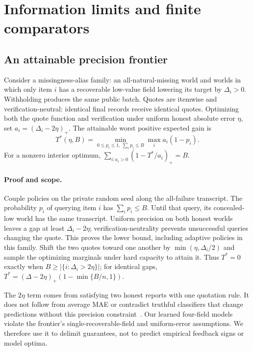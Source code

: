 \documentclass[11pt]{article}
\begin{document}
\section{Information limits and finite comparators}\label{sec:information}
\subsection{An attainable precision frontier}
Consider a missingness-alias family: an all-natural-missing world and worlds
in which only item $i$ has a recoverable low-value field lowering its target
by $\Delta_i>0$. Withholding produces the same public batch. Quotes are
itemwise and verification-neutral: identical final records receive identical
quotes. Optimizing both the quote function and verification under uniform
honest absolute error $\eta$, set $a_i=(\Delta_i-2\eta)_+$. The attainable
worst positive expected gain is
\begin{equation}
 T^*(\eta,B)=\min_{0\le p_i\le1,\ \sum_i p_i\le B}\max_i a_i(1-p_i).
 \label{eq:frontier}
\end{equation}
For a nonzero interior optimum, $\sum_{i:a_i>0}(1-T^*/a_i)_+=B$.

\paragraph{Proof and scope.}
Couple policies on the private random seed along the all-failure transcript.
The probability $p_i$ of querying item $i$ has $\sum_i p_i\le B$.
Until that query, its concealed-low world has the same transcript. Uniform
precision on both honest worlds leaves a gap at least $\Delta_i-2\eta$;
verification-neutrality prevents unsuccessful queries changing the quote.
This proves the lower bound, including adaptive policies in this family.
Shift the two quotes toward one another by
$\min(\eta,\Delta_i/2)$ and sample the optimizing marginals under hard
capacity to attain it. Thus $T^*=0$ exactly when
$B\ge|\{i:\Delta_i>2\eta\}|$; for identical gaps,
$T^*=(\Delta-2\eta)_+(1-\min\{B/n,1\})$.

The $2\eta$ term comes from satisfying two honest reports with one quotation
rule. It does not follow from average MAE or contradict truthful classifiers
that change predictions without this precision constraint~\cite{withheld}.
Our learned four-field models violate the frontier's single-recoverable-field
and uniform-error assumptions. We therefore use it to delimit guarantees,
not to predict empirical feedback signs or model optima.
\end{document}
